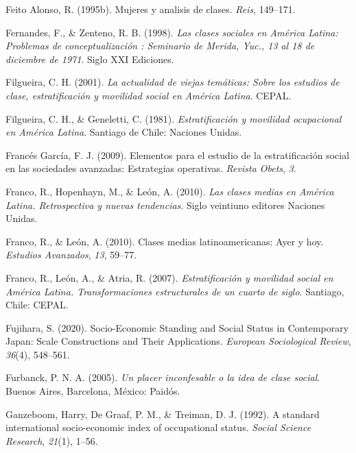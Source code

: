 \documentclass[
]{article}
\newlength{\cslhangindent}
\newlength{\cslentryspacingunit} %
\newenvironment{CSLReferences}[2] %
 {%
  \setlength{\parindent}{0pt}
  \ifodd #1
  \let\oldpar\par
  \def\par{\hangindent=\cslhangindent\oldpar}
  \fi
  \setlength{\parskip}{#2\cslentryspacingunit}
 }%
 {}
\begin{document}
\begin{CSLReferences}{1}{0}
\leavevmode{}%
Feito Alonso, R. (1995b). Mujeres y analisis de clases. \emph{Reis}, 149--171.

\leavevmode{}%
Fernandes, F., \& Zenteno, R. B. (1998). \emph{Las clases sociales en {América} {Latina}: Problemas de conceptualización : Seminario de {Merida}, {Yuc}., 13 al 18 de diciembre de 1971}. Siglo XXI Ediciones.

\leavevmode{}%
Filgueira, C. H. (2001). \emph{La actualidad de viejas temáticas: Sobre los estudios de clase, estratificación y movilidad social en {América} {Latina}}. CEPAL.

\leavevmode{}%
Filgueira, C. H., \& Geneletti, C. (1981). \emph{Estratificación y movilidad ocupacional en {América} {Latina}}. Santiago de Chile: Naciones Unidas.

\leavevmode{}%
Francés García, F. J. (2009). Elementos para el estudio de la estratificación social en las sociedades avanzadas: Estrategias operativas. \emph{Revista Obets}, \emph{3}.

\leavevmode{}%
Franco, R., Hopenhayn, M., \& León, A. (2010). \emph{Las clases medias en {América} {Latina}. {Retrospectiva} y nuevas tendencias}. Siglo veintiuno editores Naciones Unidas.

\leavevmode{}%
Franco, R., \& León, A. (2010). Clases medias latinoamericanas: Ayer y hoy. \emph{Estudios Avanzados}, \emph{13}, 59--77.

\leavevmode{}%
Franco, R., León, A., \& Atria, R. (2007). \emph{Estratificación y movilidad social en {América} {Latina}. {Transformaciones} estructurales de un cuarto de siglo}. Santiago, Chile: CEPAL.

\leavevmode{}%
Fujihara, S. (2020). Socio-{Economic} {Standing} and {Social} {Status} in {Contemporary} {Japan}: {Scale} {Constructions} and {Their} {Applications}. \emph{European Sociological Review}, \emph{36}(4), 548--561.

\leavevmode{}%
Furbanck, P. N. A. (2005). \emph{Un placer inconfesable o la idea de clase social}. Buenos Aires, Barcelona, México: Paidós.

\leavevmode{}%
Ganzeboom, Harry, De Graaf, P. M., \& Treiman, D. J. (1992). A standard international socio-economic index of occupational status. \emph{Social Science Research}, \emph{21}(1), 1--56.


\end{CSLReferences}
\end{document}
